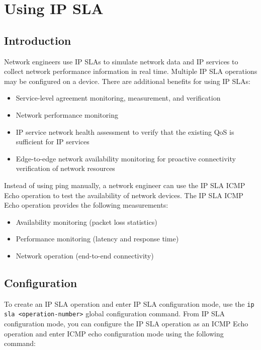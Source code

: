 \section{Using IP SLA}

\subsection{Introduction}

Network engineers use IP SLAs to simulate network data and IP services to collect network performance information in real time. Multiple IP SLA operations may be configured on a device. There are additional benefits for using IP SLAs: 

\begin{itemize}
\item Service-level agreement monitoring, measurement, and verification
\item Network performance monitoring
\item IP service network health assessment to verify that the existing QoS is sufficient for IP services
\item Edge-to-edge network availability monitoring for proactive connectivity verification of network resources
\end{itemize}

Instead of using ping manually, a network engineer can use the IP SLA ICMP Echo operation to test the availability of network devices. The IP SLA ICMP Echo operation provides the following measurements:

\begin{itemize}
\item Availability monitoring (packet loss statistics)
\item Performance monitoring (latency and response time)
\item Network operation (end-to-end connectivity)
\end{itemize}

\subsection{Configuration}

To create an IP SLA operation and enter IP SLA configuration mode, use the \verb|ip sla <operation-number>| global configuration command. From IP SLA configuration mode, you can configure the IP SLA operation as an ICMP Echo operation and enter ICMP echo configuration mode using the following command:

